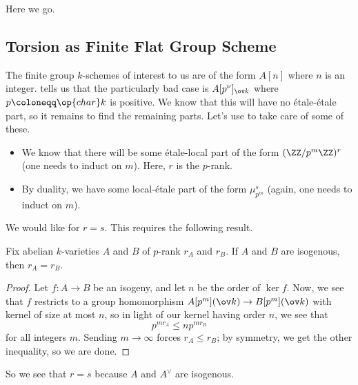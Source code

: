 \documentclass[../notes.tex]{subfiles}
\begin{document}
Here we go.

\subsection{Torsion as Finite Flat Group Scheme}
The finite group $k$-schemes of interest to us are of the form $A[n]$ where $n$ is an integer.  tells us that the particularly bad case is $A[p^\nu]_{\ov k}$ where $p\coloneqq\op{char}k$ is positive. We know that this will have no \'etale-\'etale part, so it remains to find the remaining parts. Let's use  to take care of some of these.
\begin{itemize}
	\item We know that there will be some \'etale-local part of the form $(\ZZ/p^m\ZZ)^r$ (one needs to induct on $m$). Here, $r$ is the $p$-rank.
	\item By duality, we have some local-\'etale part of the form $\mu_{p^m}^s$ (again, one needs to induct on $m$).
\end{itemize}
We would like for $r=s$. This requires the following result.
\begin{proposition}
	Fix abelian $k$-varieties $A$ and $B$ of $p$-rank $r_A$ and $r_B$. If $A$ and $B$ are isogenous, then $r_A=r_B$.
\end{proposition}
\begin{proof}
	Let $f\colon A\to B$ be an isogeny, and let $n$ be the order of $\ker f$. Now, we see that $f$ restricts to a group homomorphism $A[p^m](\ov k)\to B[p^m](\ov k)$ with kernel of size at most $n$, so in light of our kernel having order $n$, we see that
	\[p^{mr_A}\le np^{mr_B}\]
	for all integers $m$. Sending $m\to\infty$ forces $r_A\le r_B$; by symmetry, we get the other inequality, so we are done.
\end{proof}
So we see that $r=s$ because $A$ and $A^\lor$ are isogenous.
\end{document}
